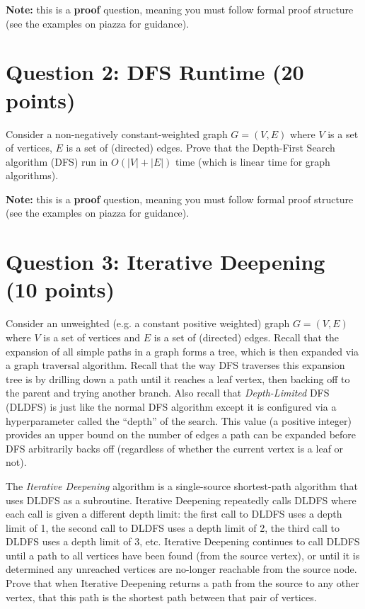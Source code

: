 \documentclass[11pt]{article}
\newcommand{\question}[1]{\section*{\normalsize #1}}
\begin{document}
\noindent\textbf{Note:} this is a \textbf{proof} question, meaning you must follow formal proof structure (see the examples on piazza for guidance).\newpage














\question{Question 2: DFS Runtime (20 points)}
Consider a non-negatively constant-weighted graph $G = (V, E)$ where $V$ is a set of vertices, $E$ is a set of (directed) edges. Prove that the Depth-First Search algorithm (DFS) run in $O(|V| + |E|)$ time (which is linear time for graph algorithms).\newline

\noindent\textbf{Note:} this is a \textbf{proof} question, meaning you must follow formal proof structure (see the examples on piazza for guidance).\newpage













\question{Question 3: Iterative Deepening (10 points)}
Consider an unweighted (e.g. a constant positive weighted) graph $G = (V, E)$ where $V$ is a set of vertices and $E$ is a set of (directed) edges. Recall that the expansion of all simple paths in a graph forms a tree, which is then expanded via a graph traversal algorithm. Recall that the way DFS traverses this expansion tree is by drilling down a path until it reaches a leaf vertex, then backing off to the parent and trying another branch. Also recall that \textit{Depth-Limited} DFS (DLDFS) is just like the normal DFS algorithm except it is configured via a hyperparameter called the ``depth'' of the search. This value (a positive integer) provides an upper bound on the number of edges a path can be expanded before DFS arbitrarily backs off (regardless of whether the current vertex is a leaf or not).\newline

\noindent The \textit{Iterative Deepening} algorithm is a single-source shortest-path algorithm that uses DLDFS as a subroutine. Iterative Deepening repeatedly calls DLDFS where each call is given a different depth limit: the first call to DLDFS uses a depth limit of 1, the second call to DLDFS uses a depth limit of 2, the third call to DLDFS uses a depth limit of 3, etc. Iterative Deepening continues to call DLDFS until a path to all vertices have been found (from the source vertex), or until it is determined any unreached vertices are no-longer reachable from the source node. Prove that when Iterative Deepening returns a path from the source to any other vertex, that this path is the shortest path between that pair of vertices.\newline
\end{document}
